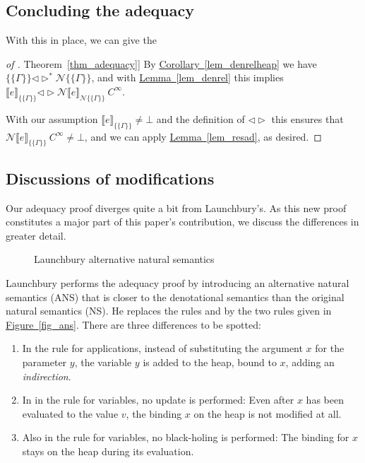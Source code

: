 \documentclass{jfp1}
\newcommand{\myref}[2]{\hyperref[#2]{#1~\ref*{#2}}}
\theoremstyle{nonumberbreak}
\newtheorem{proof}{Proof}
\newcommand{\sApp}[2]{#1\;#2}
\newcommand{\sLam}[2]{\text{\textlambda} #1.\, #2}
\newcommand{\sred}[5]{#1 : #2 \Downarrow_{#3} #4 : #5}
\newcommand{\sRule}[1]{\text{{\textsc{#1}}}}
\newcommand{\dsem}[2]{\llbracket #1 \rrbracket_{#2}}
\newcommand{\esem}[1]{\{\!\!\!\{#1\}\!\!\!\}}
\newcommand{\dsemr}[2]{\mathcal N\!\llbracket #1 \rrbracket_{#2}}
\newcommand{\esemr}[1]{\mathcal N\!\!\{\!\!\!\{#1\}\!\!\!\}}
\newcommand{\dsim}{\mathrel{\triangleleft\triangleright}}
\newcommand{\dsimheap}{\mathrel{\triangleleft\triangleright^*}}
\begin{document}
\subsection{Concluding the adequacy}

With this in place, we can give the
\begin{proof}[of \myref{Theorem}{thm_adequacy}]
By \myref{Corollary}{lem_denrelheap} we have $\esem{\Gamma}\dsimheap \esemr{\Gamma}$, and with \myref{Lemma}{lem_denrel} this implies $\dsem{e}{\esem{\Gamma}} \dsim \dsemr{e}{\esemr{\Gamma}}~C^\infty$.

With our assumption $\dsem{e}{\esem{\Gamma}} \ne \bot$ and the definition of $\dsim$ this ensures that $\dsemr{e}{\esem{\Gamma}}~C^\infty \ne \bot$, and we can apply \myref{Lemma}{lem_resad}, as desired.
\end{proof}


\subsection{Discussions of modifications}
\label{sec_modifications3}

Our adequacy proof diverges quite a bit from Launchbury's. As this new proof constitutes a major part of this paper's contribution, we discuss the differences in greater detail.

\begin{figure}
\caption{Launchbury alternative natural semantics}
\label{fig_natsem}
\end{figure}

Launchbury performs the adequacy proof by introducing an alternative natural semantics (ANS) that is closer to the denotational semantics than the original natural semantics (NS). He replaces the rules \sRule{App} and \sRule{Var} by the two rules given in \myref{Figure}{fig_ans}. There are three differences to be spotted:
\begin{enumerate}
\item In the rule for applications, instead of substituting the argument $x$ for the parameter $y$, the variable $y$ is added to the heap, bound to $x$, adding an \emph{indirection}.
\item In in the rule for variables, no update is performed: Even after $x$ has been evaluated to the value $v$, the binding $x$ on the heap is not modified at all.
\item Also in the rule for variables, no black-holing is performed: The binding for $x$ stays on the heap during its evaluation.
\end{enumerate}
\end{document}
